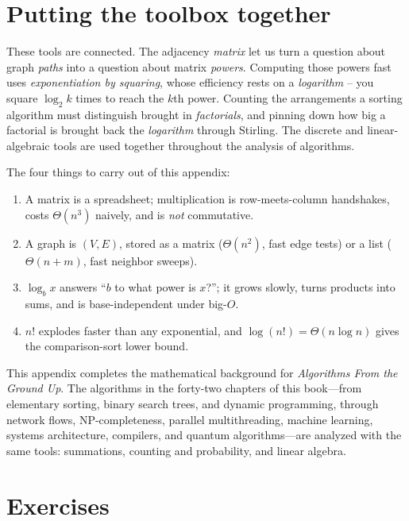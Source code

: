 \section{Putting the toolbox together}
\label{ch39:wrap}

These tools are connected. The adjacency \emph{matrix} let us turn a question about graph \emph{paths} into a
question about matrix \emph{powers}. Computing those powers fast uses
\emph{exponentiation by squaring}, whose efficiency rests on a
\emph{logarithm} -- you square $\log_2 k$ times to reach the $k$th power.
Counting the arrangements a sorting algorithm must distinguish brought in
\emph{factorials}, and pinning down how big a factorial is brought back the
\emph{logarithm} through Stirling. The discrete and linear-algebraic tools are
used together throughout the analysis of algorithms.

\begin{focusbox}
The four things to carry out of this appendix:
\begin{enumerate}
  \item A matrix is a spreadsheet; multiplication is row-meets-column handshakes,
        costs $\Theta(n^3)$ naively, and is \emph{not} commutative.
  \item A graph is $(V, E)$, stored as a matrix ($\Theta(n^2)$, fast edge tests)
        or a list ($\Theta(n+m)$, fast neighbor sweeps).
  \item $\log_b x$ answers ``$b$ to what power is $x$?''; it grows slowly,
        turns products into sums, and is base-independent under big-$O$.
  \item $n!$ explodes faster than any exponential, and $\log(n!) =
        \Theta(n \log n)$ gives the comparison-sort lower bound.
\end{enumerate}
\end{focusbox}

This appendix completes the mathematical background for \emph{Algorithms From the
Ground Up}. The algorithms in the forty-two chapters of this book---from
elementary sorting, binary search trees, and dynamic programming, through
network flows, NP-completeness, parallel multithreading, machine learning,
systems architecture, compilers, and quantum algorithms---are analyzed with the
same tools: summations, counting and probability, and linear algebra.

\section*{Exercises}

